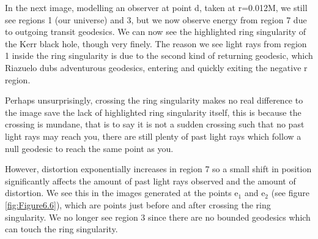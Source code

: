 \documentclass[oneside,openright,frontopenright, singlespacing]{dmathesis}
\begin{document}
\vspace{1em}
	In the next image, modelling an observer at point d, taken at r=0.012M, we still see regions 1 (our universe) and 3, but we now observe energy from region 7 due to outgoing transit geodesics. We can now see the highlighted ring singularity of the Kerr black hole, though very finely. The reason we see light rays from region 1 inside the ring singularity is due to the second kind of returning geodesic, which Riazuelo dubs adventurous geodesics, entering and quickly exiting the negative r region.

\vspace{1em}
	Perhaps unsurprisingly, crossing the ring singularity makes no real difference to the image save the lack of highlighted ring singularity itself, this is because the crossing is mundane, that is to say it is not a sudden crossing such that no past light rays may reach you, there are still plenty of past light rays which follow a null geodesic to reach the same point as you.

\vspace{1em}
	However, distortion exponentially increases in region 7 so a small shift in position significantly affects the amount of past light rays observed and the amount of distortion. We see this in the images generated at the points e$_1$ and e$_2$ (see figure \ref{fig:Figure6.6}), which are points just before and after crossing the ring singularity. We no longer see region 3 since there are no bounded geodesics which can touch the ring singularity.
\end{document}
